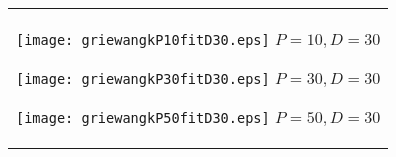 \documentclass[a4paper,11pt,oneside,openany]{jsbook}
\begin{document}
\begin{figure}[htbp]
  \begin{center}
    \begin{tabular}{c}


      \begin{minipage}{0.33\hsize}
        \begin{center}
          \texttt{[image: griewangkP10fitD30.eps]}
          \hspace{1.2cm}$P=10, D=30
$        \end{center}
      \end{minipage}

      \begin{minipage}{0.33\hsize}
        \begin{center}
          \texttt{[image: griewangkP30fitD30.eps]}
          \hspace{1.2cm}$P=30, D=30
$        \end{center}
      \end{minipage}

      \begin{minipage}{0.33\hsize}
        \begin{center}
          \texttt{[image: griewangkP50fitD30.eps]}
          \hspace{1.2cm}$P=50, D=30
$        \end{center}
      \end{minipage}
    \end{tabular}
  \end{center}
\end{figure}
\end{document}
